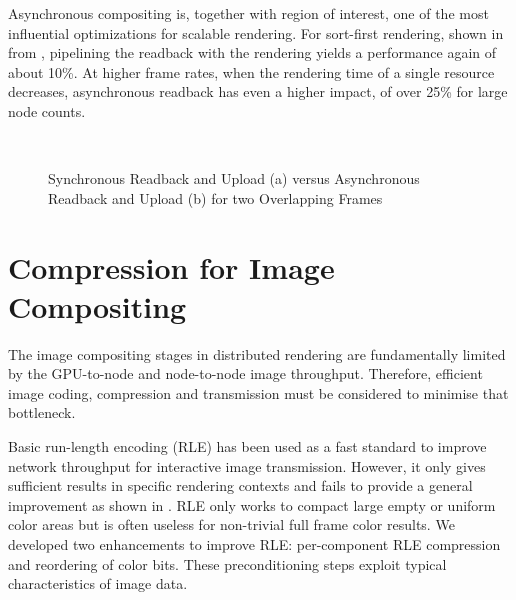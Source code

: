 Asynchronous compositing is, together with region of interest, one of the most
influential optimizations for scalable rendering. For sort-first rendering,
shown in  from \cite{EBAHMP:12}, pipelining the readback with the
rendering yields a performance again of about 10\%. At higher frame rates, when
the rendering time of a single resource decreases, asynchronous readback has
even a higher impact, of over 25\% for large node counts.

\begin{figure}[t]\center
  \\
  \caption{Synchronous Readback and Upload (a) versus
    Asynchronous Readback and Upload (b) for two Overlapping Frames}
\end{figure}


\section{Compression for Image Compositing}

The image compositing stages in distributed rendering are fundamentally limited
by the GPU-to-node and node-to-node image throughput. Therefore, efficient
image coding, compression and transmission must be considered to minimise that
bottleneck.

Basic run-length encoding (RLE) has been used as a fast standard to improve
network throughput for interactive image transmission. However, it only gives
sufficient results in specific rendering contexts and fails to provide a
general improvement as shown in \cite{MEP:10}. RLE only works to compact large
empty or uniform color areas but is often useless for non-trivial full frame
color results. We developed two enhancements to improve RLE: per-component RLE
compression and reordering of color bits. These preconditioning steps exploit
typical characteristics of image data.

